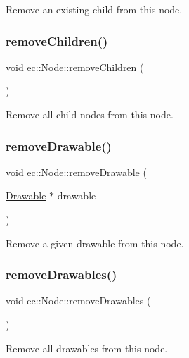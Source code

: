 Remove an existing child from this node. \mbox{\label{classec_1_1_node_a4d9f13d7482fe4612ec2cffa8a06cc00}} 
\subsubsection{\texorpdfstring{remove\+Children()}{removeChildren()}}
{\footnotesize\ttfamily void ec\+::\+Node\+::remove\+Children (\begin{DoxyParamCaption}{ }\end{DoxyParamCaption})}

Remove all child nodes from this node. \mbox{\label{classec_1_1_node_a9cd4bc1df04ee734dd11ebe0b9079434}} 
\subsubsection{\texorpdfstring{remove\+Drawable()}{removeDrawable()}}
{\footnotesize\ttfamily void ec\+::\+Node\+::remove\+Drawable (\begin{DoxyParamCaption}\item[{\mbox{\hyperlink{classec_1_1_drawable}{Drawable}} $\ast$}]{drawable }\end{DoxyParamCaption})}

Remove a given drawable from this node. \mbox{\label{classec_1_1_node_a57fd7f0d158527df372880399ca48002}} 
\subsubsection{\texorpdfstring{remove\+Drawables()}{removeDrawables()}}
{\footnotesize\ttfamily void ec\+::\+Node\+::remove\+Drawables (\begin{DoxyParamCaption}{ }\end{DoxyParamCaption})}

Remove all drawables from this node. \mbox{\label{classec_1_1_node_add44dc77d499886e9c75a0e1c1e446cf}} 
